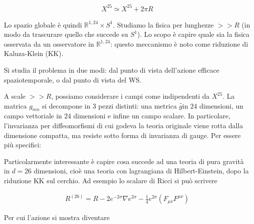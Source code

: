 \documentclass{report}
\begin{document}
\begin{align}
    X^{25} \simeq X^{25} + 2\pi R
\end{align}

Lo spazio globale è quindi \(\mathbb{R}^{1, 24}\times S^1\). Studiamo la fisica per lunghezze \( >> R\) (in modo da trascurare quello che succede su \(S^1\)). Lo scopo è capire quale sia la fisica osservata da un osservatore in \(\mathbb{R}^{1, 24}\): questo meccanismo è noto come riduzione di Kaluza-Klein (KK). 

Si studia il problema in due modi: dal punto di vista dell'azione efficace spaziotemporale, o dal punto di vista del WS. 

A scale \(>> R\), possiamo considerare i campi come indipendenti da \(X^{25}\). La matrica \(g_{mn}\) si decompone in 3 pezzi distinti: una metrica \(\hat{g}\)in \(24\) dimensioni, un campo vettoriale in \(24\) dimensioni e infine un campo scalare. In particolare, l'invarianza per diffeomorfismi di cui godeva la teoria originale viene rotta dalla dimensione compatta, ma resiste sotto forma di invarianza di gauge. Per essere più specifici: 



Particolarmente interessante è capire cosa succede ad una teoria di pura gravità in \(d=26\) dimensioni, cioè una teoria con lagrangiana di Hilbert-Einstein, dopo la riduzione KK sul cerchio. Ad esempio lo scalare di Ricci si può scrivere 

\begin{align}
    R^{(26)} = R - 2e^{-2\sigma}\nabla e^{2\sigma} - \frac{1}{4}e^{2\sigma}(F_{\mu\nu}F^{\mu\nu})
\end{align}

Per cui l'azione si mostra diventare 
\end{document}
